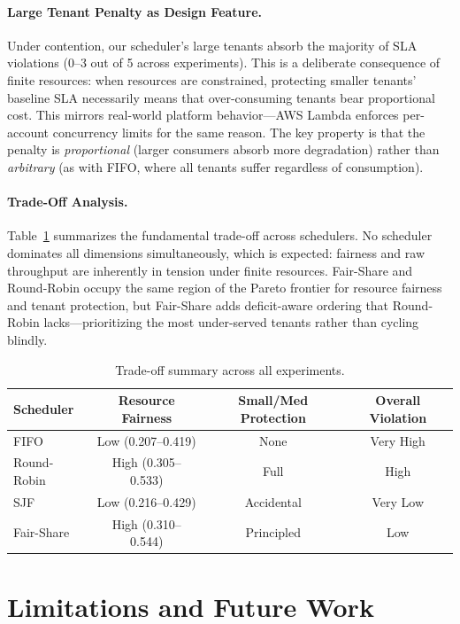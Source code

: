 \documentclass[runningheads]{llncs}
\begin{document}
\paragraph{Large Tenant Penalty as Design Feature.}
Under contention, our scheduler's large tenants absorb the majority of SLA violations (0--3 out of 5 across experiments). This is a deliberate consequence of finite resources: when resources are constrained, protecting smaller tenants' baseline SLA necessarily means that over-consuming tenants bear proportional cost. This mirrors real-world platform behavior---AWS Lambda enforces per-account concurrency limits for the same reason. The key property is that the penalty is \emph{proportional} (larger consumers absorb more degradation) rather than \emph{arbitrary} (as with FIFO, where all tenants suffer regardless of consumption).

\paragraph{Trade-Off Analysis.}
Table~\ref{tab:tradeoff} summarizes the fundamental trade-off across schedulers. No scheduler dominates all dimensions simultaneously, which is expected: fairness and raw throughput are inherently in tension under finite resources. Fair-Share and Round-Robin occupy the same region of the Pareto frontier for resource fairness and tenant protection, but Fair-Share adds deficit-aware ordering that Round-Robin lacks---prioritizing the most under-served tenants rather than cycling blindly.

\begin{table}[!ht]
\centering
\caption{Trade-off summary across all experiments.}\label{tab:tradeoff}
\small
\begin{tabular}{@{}lccc@{}}
\toprule
\textbf{Scheduler} & \textbf{Resource Fairness} & \textbf{Small/Med Protection} & \textbf{Overall Violation} \\
\midrule
FIFO & Low (0.207--0.419) & None & Very High \\
Round-Robin & High (0.305--0.533) & Full & High \\
SJF & Low (0.216--0.429) & Accidental & Very Low \\
Fair-Share & High (0.310--0.544) & Principled & Low \\
\bottomrule
\end{tabular}
\end{table}

\section{Limitations and Future Work}\label{sec:limitations}
\end{document}
